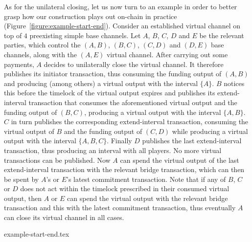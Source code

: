   As for the unilateral closing, let us now turn to an example in order to
  better grasp how our construction plays out on-chain in practice
  (Figure~\ref{figure:example-start-end}). Consider an
  established virtual channel on top of $4$ preexisting simple base channels.
  Let $A$, $B$, $C$, $D$ and $E$ be the relevant parties, which control the $(A,
  B)$, $(B, C)$, $(C, D)$ and $(D, E)$ base channels, along with the $(A, E)$
  virtual channel. After carrying out some payments, $A$ decides to unilaterally
  close the virtual channel. It therefore publishes its initiator transaction,
  thus consuming the funding output of $(A, B)$ and producing (among others) a
  virtual output with the interval $\{A\}$. $B$ notices this before the timelock
  of the virtual output expires and publishes its extend-interval
  transaction that consumes the aforementioned virtual output and the funding
  output of $(B, C)$, producing a virtual output with the interval $\{A, B\}$.
  $C$ in turn publishes the corresponding extend-interval transaction, consuming
  the virtual output of $B$ and the funding output of $(C, D)$ while producing a
  virtual output with the interval $\{A, B, C\}$. Finally $D$ publishes the last
  extend-interval transaction, thus producing an interval with all players.
  No more virtual transactions can be published. Now $A$ can spend the virtual
  output of the last extend-interval transaction with the relevant bridge
  transaction, which can then be spent by $A$'s or $E$'s latest commitment
  transaction. Note that if any of $B$, $C$ or $D$ does not act within the
  timelock prescribed in their consumed virtual output, then $A$ or $E$ can
  spend the virtual output with the relevant bridge transaction and this with
  the latest commitment transaction, thus eventually $A$ can close its virtual
  channel in all cases.

  \begin{figure*}
    \centering
    {example-start-end.tex}
    \caption{$4$ simple channels supporting a virtual. $A$ starts closing
    by publishing its initiator tx, then parties $B$--$D$ each
    publishes its extend-interval tx with the relevant interval. No party is
    negligent. Virtual outputs are marked with their interval.}
    \label{figure:example-start-end}
  \end{figure*}

